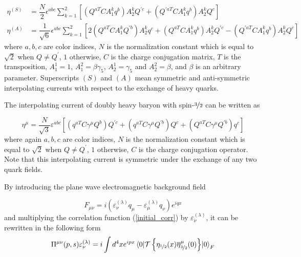 \begin{equation}
    \begin{aligned}
        \eta^{(S)} &= \dfrac{N}{2}\epsilon^{abc}\sum_{k=1}^2\left[\left(Q^{aT}CA_1^kq^b\right)A_2^kQ^{\prime c}+\left(Q^{\prime aT}CA_1^kq^b\right)A_2^kQ^c\right] \\
        \eta^{(A)} &= \dfrac{1}{\sqrt{6}}\epsilon^{abc}\sum_{k=1}^2\left[2\left(Q^{aT}CA_1^kQ^{\prime b}\right)A_2^kq^c + \left(Q^{aT}CA_1^kq^b\right)A_2^kQ^{\prime c} - \left(Q^{\prime aT}CA_1^kq^b\right)A_2^kQ^{c}\right]
    \end{aligned}
    \label{spin12currents}
\end{equation}
%
where $a,b,c$ are color indices, $N$ is the normalization constant which is equal to $\sqrt{2}$ when $Q\neq Q^\prime$, $1$ otherwise, $C$ is the charge conjugation matrix, $T$ is the transposition, $A_1^1 = 1$, $A_1^2 = \beta\gamma_5$, $A_2^1 = \gamma_5$ and $A_2^2 = \beta$, and $\beta$ is an arbitrary parameter. Superscripts $(S)$ and $(A)$ mean symmetric and anti-symmetric interpolating currents with respect to the exchange of heavy quarks.

The interpolating current of doubly heavy baryon with spin-$\nicefrac{3}{2}$ can be written as

\begin{equation}
    \eta^{\mu} = \dfrac{N}{\sqrt{3}}\varepsilon^{abc}\left[\left(q^{aT}C\gamma^{\mu}Q^b\right)Q^{\prime c} + \left(q^{aT}C\gamma^{\mu}Q^{\prime b}\right)Q^c + \left(Q^{aT}C\gamma^\mu Q^{\prime b}\right)q^c\right]
    \label{spin32current}
\end{equation}
where again $a,b,c$ are color indices, $N$ is the normalization constant which is equal to $\sqrt{2}$ when $Q\neq Q^\prime$, $1$ otherwise, $C$ is the charge conjugation operator. Note that this interpolating current is symmetric under the exchange of any two quark fields.

By introducing the plane wave electromagnetic background field

\begin{equation}
    F_{\mu\nu} = i\left(\varepsilon_\nu^{(\lambda)}q_\mu-\varepsilon_\mu^{(\lambda)}q_\nu\right)e^{iqx}
    \label{backgroundfield}
\end{equation}
and multiplying the correlation function (\ref{initial_corr}) by $\varepsilon_\nu^{(\lambda)}$, it can be rewritten in the following form
\begin{equation}
    \Pi^{\mu\nu}(p,s) \varepsilon_\nu^{(\lambda)} = i\int d^4x e^{ipx} \mel{0}{\mathcal{T}\left\{\eta_{\nicefrac{1}{2}}(x)\overline{\eta}^\mu_{\nicefrac{3}{2}}(0)\right\}}{0}_F
    \label{spin12bfcorr}
\end{equation}

